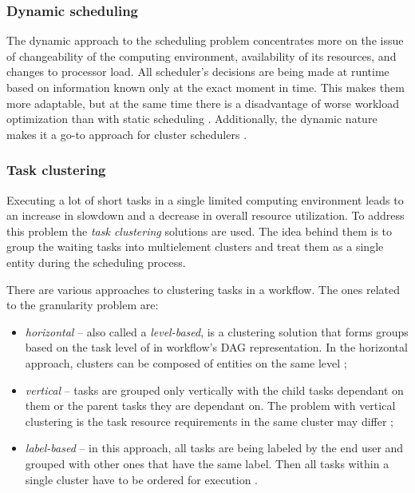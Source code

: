 \subsubsection{Dynamic scheduling}
\label{s:ProblemDomain:DynamicSched}

The dynamic approach to the scheduling problem concentrates more on the issue of changeability of the computing environment, availability of its resources, and changes to processor load.
All scheduler's decisions are being made at runtime based on information known only at the exact moment in time.
This makes them more adaptable, but at the same time there is a disadvantage of worse workload optimization than with static scheduling \cite{b:Dynamic-Scheduling-Case-Study}.
Additionally, the dynamic nature makes it a go-to approach for cluster schedulers \cite{b:Tetris, b:Graphene}.



\subsubsection{Task clustering}
\label{s:ProblemDomain:TaskClustering}

Executing a lot of short tasks in a single limited computing environment leads to an increase in slowdown and a decrease in overall resource utilization.
To address this problem the \emph{task clustering} solutions are used.
The idea behind them is to group the waiting tasks into multielement clusters and treat them as a single entity \cite{b:Task-Clustering-Pegasus} during the scheduling process.

There are various approaches to clustering tasks in a workflow.
The ones related to the granularity problem are:


\begin{itemize}
  \item{
\emph{horizontal} -- also called a \emph{level-based}, is a clustering solution that forms groups based on the task level of in workflow's DAG representation. In the horizontal approach, clusters can be composed of entities on the same level
};
\item{
\emph{vertical} -- tasks are grouped only vertically with the child tasks dependant on them or the parent tasks they are dependant on. The problem with vertical clustering is the task resource requirements in the same cluster may differ
};
  \item{
\emph{label-based} -- in this approach, all tasks are being labeled by the end user and grouped with other ones that have the same label. Then all tasks within a single cluster have to be ordered for execution \cite{b:Task-Clustering-Hybrid-Algorithm, b:Task-Clustering-Pegasus}.
}
\end{itemize}


